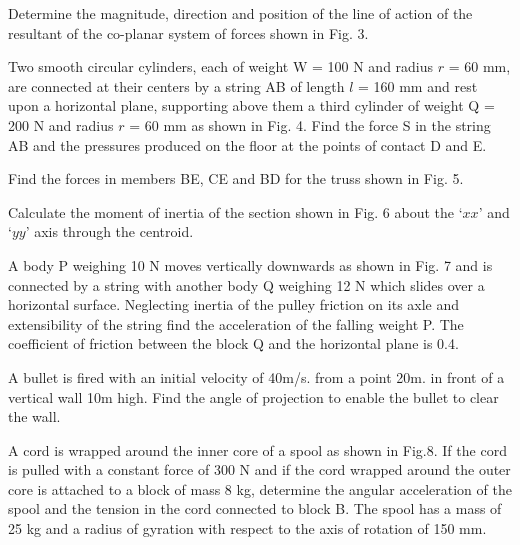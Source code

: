 \item

  

  \iitem Determine the magnitude, direction and position of the line of action of the resultant of the
  co-planar system of forces shown in Fig. 3.

  \Or
  
\item Two smooth circular cylinders, each of weight W = 100 N and radius $r$ = 60 mm, are connected
  at their centers by a string AB of length $l$ = 160 mm and rest upon a horizontal plane,
  supporting above them a third cylinder of weight Q = 200 N and radius $r$ = 60 mm as shown in Fig. 4.
  Find the force S in the string AB and the pressures produced on the floor at the points of contact
  D and E.

  \ene


\newpage




\item 
  
  \iitem Find the forces in members BE, CE and BD for the truss shown in Fig. 5.

    \Or

  \item Calculate the moment of inertia of the section shown in Fig. 6 about the `$xx$' and `$yy$' axis
    through the centroid.

  \ene


\item


  

  \iitem A body P weighing 10 N moves vertically downwards as shown in Fig. 7 and is connected by
    a string with another body Q weighing 12 N which slides over a horizontal surface. Neglecting
    inertia of the pulley friction on its axle and extensibility of the string find the 
    acceleration of the falling weight P. The coefficient of friction between the block Q and the 
    horizontal plane is 0.4.

    \Or

  \item A bullet is fired with an initial velocity of 40m/s. from a point 20m. in front of a vertical
    wall 10m high. Find the angle of projection to enable the bullet to clear the wall.

    \ene
\newpage



\item
  \iitem A cord is wrapped around the inner core of a spool as shown in Fig.8. If the cord is pulled
  with a constant force of 300 N and if the cord wrapped around the outer core is attached to a block
  of mass 8 kg, determine the angular acceleration of the spool and the tension in the cord connected
  to block B. The spool has a mass of 25 kg and a radius of gyration with respect to the axis of rotation
  of 150 mm.

